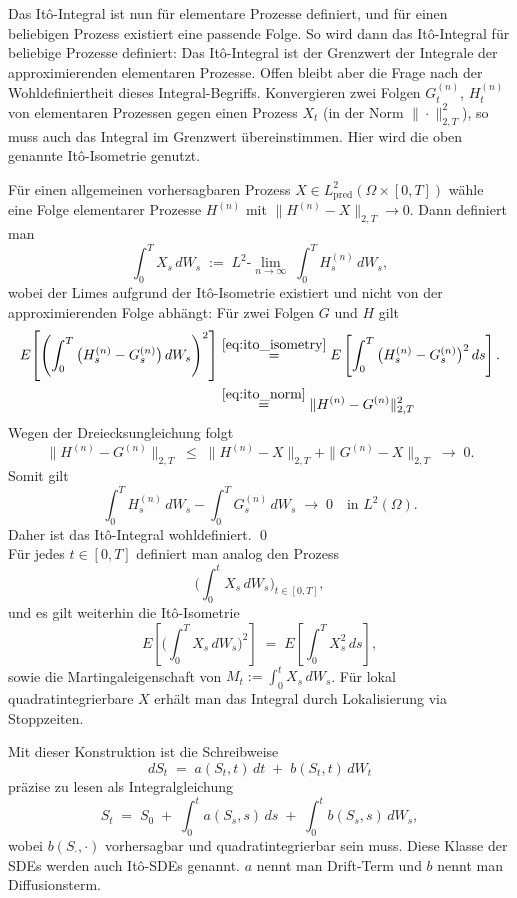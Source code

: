 \begin{defi}[It\^o-Integral]
Das It\^o-Integral ist nun für elementare Prozesse definiert, und für einen beliebigen Prozess existiert
eine passende Folge. So wird dann das It\^o-Integral für beliebige Prozesse definiert:
Das It\^o-Integral ist der Grenzwert der Integrale der approximierenden elementaren Prozesse.
Offen bleibt aber die Frage nach der Wohldefiniertheit dieses Integral-Begriffs. Konvergieren zwei Folgen $G_t^{(n)}$, $H_t^{(n)}$ von
elementaren Prozessen gegen einen Prozess $X_t$ (in der Norm $\|\cdot\|_{2,T}^2$), so muss auch das Integral im Grenzwert übereinstimmen.
Hier wird die oben genannte It\^o-Isometrie genutzt.

Für einen allgemeinen vorhersagbaren Prozess $X\in L^2_{\mathrm{pred}}(\Omega\times[0,T])$ wähle 
eine Folge elementarer Prozesse $H^{(n)}$ mit
$\|H^{(n)}-X\|_{2,T}\to 0$. Dann definiert man
$$
\int_0^T X_s\,dW_s \;:=\; L^2\text{-}\lim_{n\to\infty}\;\int_0^T H^{(n)}_s\,dW_s,
$$
wobei der Limes aufgrund der It\^o-Isometrie existiert und nicht von der approximierenden Folge abhängt:
Für zwei Folgen $G$ und $H$ gilt
$$
\begin{aligned}
E\!\left[
   \left( \int_0^T \big(H^{(n)}_s - G^{(n)}_s\big)\,dW_s \right)^2
\right]
&\overset{\ref{eq:ito_isometry}}{=}
E \left [ \int_0^T \big(H^{(n)}_s - G^{(n)}_s\big)^2\,ds \right ].
\\ &\overset{\ref{eq:ito_norm}}{=} \|H^{(n)} - G^{(n)}\|_{2,T}^2
\end{aligned}
$$
Wegen der Dreiecksungleichung folgt
$$
\|H^{(n)} - G^{(n)}\|_{2,T} 
\;\le\; 
\|H^{(n)} - X\|_{2,T} + \|G^{(n)} - X\|_{2,T}
\;\to\; 0.
$$
Somit gilt
$$
\int_0^T H^{(n)}_s\,dW_s - \int_0^T G^{(n)}_s\,dW_s 
\;\to\; 0 \quad \text{in } L^2(\Omega).
$$
Daher ist das It\^o-Integral wohldefiniert. \qed \\
Für jedes $t\in[0,T]$ definiert man analog den Prozess
$$
\Big(\int_0^t X_s\,dW_s\Big)_{t\in[0,T]},
$$
und es gilt weiterhin die It\^o-Isometrie
$$
E\!\left[\Big(\int_0^T X_s\,dW_s\Big)^{\!2}\right] \;=\; E\!\left[\int_0^T X_s^{2}\,ds\right],
$$
sowie die Martingaleigenschaft von $M_t:=\int_0^t X_s\,dW_s$. Für lokal 
quadratintegrierbare $X$ erhält man das Integral durch Lokalisierung via Stoppzeiten.
\end{defi}

\begin{defi}
Mit dieser Konstruktion ist die Schreibweise
$$
dS_t \;=\; a(S_t,t)\,dt \;+\; b(S_t,t)\,dW_t
$$
präzise zu lesen als Integralgleichung
$$
S_t \;=\; S_0 \;+\; \int_0^t a(S_s,s)\,ds \;+\; \int_0^t b(S_s,s)\,dW_s,
$$
wobei $b(S_\cdot,\cdot)$ vorhersagbar und quadratintegrierbar sein muss. Diese Klasse der SDEs werden auch It\^o-SDEs genannt.
$a$ nennt man Drift-Term und $b$ nennt man Diffusionsterm.
\end{defi}

